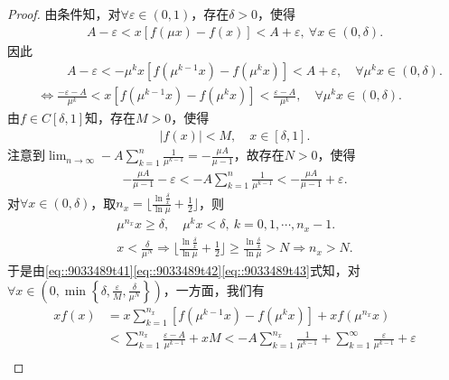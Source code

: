 \documentclass[../../main.tex]{subfiles}
\begin{document}
\begin{proof}
由条件知，对$\forall \varepsilon \in (0,1)$，存在$\delta > 0$，使得
\begin{align*}
A - \varepsilon < x\left[ f\left( \mu x \right) - f\left( x \right) \right] < A + \varepsilon, \ \forall x \in (0,\delta). 
\end{align*}
因此
\begin{align}
&\quad \quad \,\,A-\varepsilon <-\mu ^kx\left[ f\left( \mu ^{k-1}x \right) -f\left( \mu ^kx \right) \right] <A+\varepsilon , \quad \forall \mu ^kx\in (0,\delta ).
\nonumber \\
&\Longleftrightarrow \frac{-\varepsilon -A}{\mu ^k}<x\left[ f\left( \mu ^{k-1}x \right) -f\left( \mu ^kx \right) \right] <\frac{\varepsilon -A}{\mu ^k}, \quad  \forall \mu ^kx\in (0,\delta ).\label{eq::9033489t41}
\end{align}
由$f \in C\left[ \delta,1 \right]$知，存在$M > 0$，使得
\begin{align}
\left| f\left( x \right) \right| < M, \quad x \in \left[ \delta,1 \right]. \label{eq::9033489t42}
\end{align}
注意到$\lim_{n \to \infty} -A\sum_{k=1}^n \frac{1}{\mu^{k-1}} = -\frac{\mu A}{\mu - 1}$，故存在$N > 0$，使得
\begin{align}
-\frac{\mu A}{\mu - 1} - \varepsilon < -A\sum_{k=1}^n \frac{1}{\mu^{k-1}} < -\frac{\mu A}{\mu - 1} + \varepsilon. \label{eq::9033489t43}
\end{align}
对$\forall x \in (0,\delta)$，取$n_x = \lfloor \frac{\ln \frac{\delta}{x}}{\ln \mu} + \frac{1}{2} \rfloor$，则
\begin{gather*}
\mu^{n_x} x \geqslant \delta, \quad \mu^k x < \delta, \ k = 0,1,\cdots,n_x - 1.\\
x < \frac{\delta}{\mu^N} \Longrightarrow \lfloor \frac{\ln \frac{\delta}{x}}{\ln \mu} + \frac{1}{2} \rfloor \geqslant \frac{\ln \frac{\delta}{x}}{\ln \mu} > N \Longrightarrow n_x > N.
\end{gather*}
于是由\eqref{eq::9033489t41}\eqref{eq::9033489t42}\eqref{eq::9033489t43}式知，对$\forall x \in \left( 0,\min \left\{ \delta, \frac{\varepsilon}{M}, \frac{\delta}{\mu^N} \right\} \right)$，一方面，我们有
\begin{align*}
xf\left( x \right) &= x\sum_{k=1}^{n_x} \left[ f\left( \mu^{k-1}x \right) - f\left( \mu^k x \right) \right] + xf\left( \mu^{n_x} x \right) \\
&< \sum_{k=1}^{n_x} \frac{\varepsilon - A}{\mu^{k-1}} + xM < -A\sum_{k=1}^{n_x} \frac{1}{\mu^{k-1}} + \sum_{k=1}^{\infty} \frac{\varepsilon}{\mu^{k-1}} + \varepsilon \\

\end{align*}
\end{proof}
\end{document}
